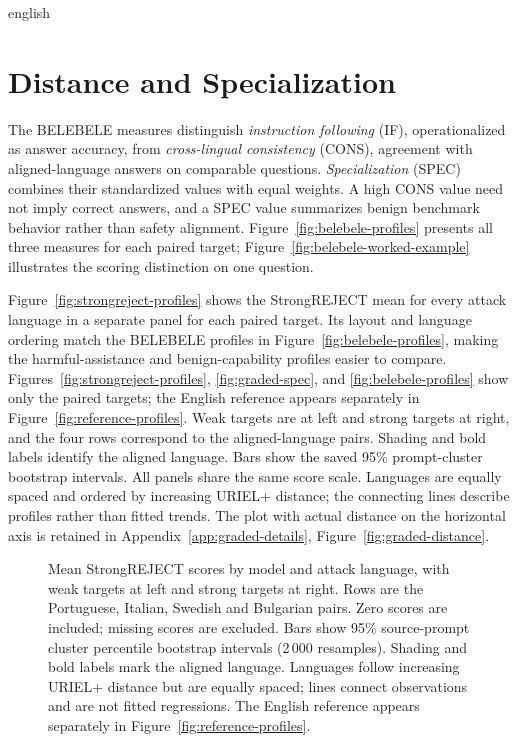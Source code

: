 \begin{otherlanguage*}{english}
\clearpage
\section{Distance and Specialization}
\label{sec:graded-distance-spec}
The BELEBELE measures distinguish \emph{instruction following} (IF), operationalized as answer accuracy, from \emph{cross-lingual consistency} (CONS), agreement with aligned-language answers on comparable questions. \emph{Specialization} (SPEC) combines their standardized values with equal weights. A high CONS value need not imply correct answers, and a SPEC value summarizes benign benchmark behavior rather than safety alignment. Figure~\ref{fig:belebele-profiles} presents all three measures for each paired target; Figure~\ref{fig:belebele-worked-example} illustrates the scoring distinction on one question.

\GradedCorrelationsTable
\clearpage
Figure~\ref{fig:strongreject-profiles} shows the StrongREJECT mean for every attack language in a separate panel for each paired target. Its layout and language ordering match the BELEBELE profiles in Figure~\ref{fig:belebele-profiles}, making the harmful-assistance and benign-capability profiles easier to compare. Figures~\ref{fig:strongreject-profiles}, \ref{fig:graded-spec}, and \ref{fig:belebele-profiles} show only the paired targets; the English reference appears separately in Figure~\ref{fig:reference-profiles}. Weak targets are at left and strong targets at right, and the four rows correspond to the aligned-language pairs. Shading and bold labels identify the aligned language. Bars show the saved 95\% prompt-cluster bootstrap intervals. All panels share the same score scale. Languages are equally spaced and ordered by increasing URIEL+ distance; the connecting lines describe profiles rather than fitted trends. The plot with actual distance on the horizontal axis is retained in Appendix~\ref{app:graded-details}, Figure~\ref{fig:graded-distance}.
\begin{figure}[p]\centering
\caption[StrongREJECT profiles by model and attack language]{Mean StrongREJECT scores by model and attack language, with weak targets at left and strong targets at right. Rows are the Portuguese, Italian, Swedish and Bulgarian pairs. Zero scores are included; missing scores are excluded. Bars show 95\% source-prompt cluster percentile bootstrap intervals (2\,000 resamples). Shading and bold labels mark the aligned language. Languages follow increasing URIEL+ distance but are equally spaced; lines connect observations and are not fitted regressions. The English reference appears separately in Figure~\ref{fig:reference-profiles}.}


\end{figure}
\end{otherlanguage*}
